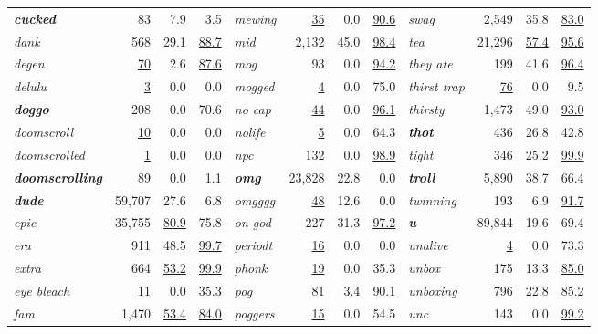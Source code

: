 \documentclass[11pt]{article}
\begin{document}
\begin{table}[tp]
\begin{tabular}{lrrr@{\hskip 2em}lrrr@{\hskip 2em}lrrr}
\textbf{\textit{cucked}} & 83 & 7.9 & 3.5 & \textit{mewing} & \underline{35} & 0.0 & \underline{90.6} & \textit{swag} & 2{,}549 & 35.8 & \underline{83.0} \\
\textit{dank} & 568 & 29.1 & \underline{88.7} & \textit{mid} & 2{,}132 & 45.0 & \underline{98.4} & \textit{tea} & 21{,}296 & \underline{57.4} & \underline{95.6} \\
\textit{degen} & \underline{70} & 2.6 & \underline{87.6} & \textit{mog} & 93 & 0.0 & \underline{94.2} & \textit{they ate} & 199 & 41.6 & \underline{96.4} \\
\textit{delulu} & \underline{3} & 0.0 & 0.0 & \textit{mogged} & \underline{4} & 0.0 & 75.0 & \textit{thirst trap} & \underline{76} & 0.0 & 9.5 \\
\textbf{\textit{doggo}} & 208 & 0.0 & 70.6 & \textit{no cap} & \underline{44} & 0.0 & \underline{96.1} & \textit{thirsty} & 1{,}473 & 49.0 & \underline{93.0} \\
\textit{doomscroll} & \underline{10} & 0.0 & 0.0 & \textit{nolife} & \underline{5} & 0.0 & 64.3 & \textbf{\textit{thot}} & 436 & 26.8 & 42.8 \\
\textit{doomscrolled} & \underline{1} & 0.0 & 0.0 & \textit{npc} & 132 & 0.0 & \underline{98.9} & \textit{tight} & 346 & 25.2 & \underline{99.9} \\
\textbf{\textit{doomscrolling}} & 89 & 0.0 & 1.1 & \textbf{\textit{omg}} & 23{,}828 & 22.8 & 0.0 & \textbf{\textit{troll}} & 5{,}890 & 38.7 & 66.4 \\
\textbf{\textit{dude}} & 59{,}707 & 27.6 & 6.8 & \textit{omgggg} & \underline{48} & 12.6 & 0.0 & \textit{twinning} & 193 & 6.9 & \underline{91.7} \\
\textit{epic} & 35{,}755 & \underline{80.9} & 75.8 & \textit{on god} & 227 & 31.3 & \underline{97.2} & \textbf{\textit{u}} & 89{,}844 & 19.6 & 69.4 \\
\textit{era} & 911 & 48.5 & \underline{99.7} & \textit{periodt} & \underline{16} & 0.0 & 0.0 & \textit{unalive} & \underline{4} & 0.0 & 73.3 \\
\textit{extra} & 664 & \underline{53.2} & \underline{99.9} & \textit{phonk} & \underline{19} & 0.0 & 35.3 & \textit{unbox} & 175 & 13.3 & \underline{85.0} \\
\textit{eye bleach} & \underline{11} & 0.0 & 35.3 & \textit{pog} & 81 & 3.4 & \underline{90.1} & \textit{unboxing} & 796 & 22.8 & \underline{85.2} \\
\textit{fam} & 1{,}470 & \underline{53.4} & \underline{84.0} & \textit{poggers} & \underline{15} & 0.0 & 54.5 & \textit{unc} & 143 & 0.0 & \underline{99.2} \\

\end{tabular}
\end{table}
\end{document}
